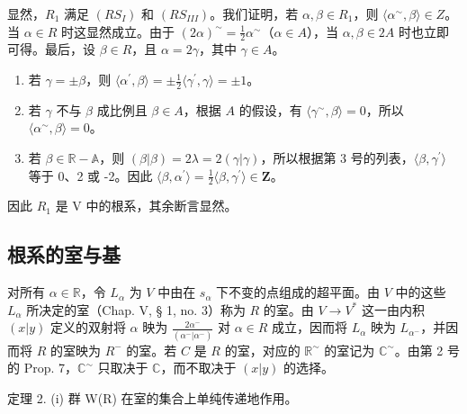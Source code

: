 显然，\(R_{1}\) 满足 \((RS_{I})\) 和 \((RS_{III})\)。我们证明，若 \(\alpha, \beta \in R_{1}\)，则 \(\langle\alpha^{\sim}, \beta\rangle \in Z\)。当 \(\alpha \in R\) 时这显然成立。由于 \((2\alpha)^{\sim} = \frac{1}{2}\alpha^{\sim}\)（\(\alpha \in A\)），当 \(\alpha, \beta \in 2A\) 时也立即可得。最后，设 \(\beta \in R\)，且 \(\alpha = 2\gamma\)，其中 \(\gamma \in A\)。

\begin{enumerate}
\def\labelenumi{\arabic{enumi})}
\item
  若 \(\gamma = \pm \beta\)，则 \(\langle \alpha^{\prime},\beta \rangle = \pm \frac{1}{2}\langle \gamma^{\prime},\gamma \rangle = \pm 1\)。
\item
  若 \(\gamma\) 不与 \(\beta\) 成比例且 \(\beta \in A\)，根据 \(A\) 的假设，有 \(\langle \gamma^{\sim},\beta \rangle = 0\)，所以 \(\langle \alpha^{\sim},\beta \rangle = 0\)。
\item
  若 \(\beta \in \mathbb{R} - \mathbb{A}\)，则 \((\beta |\beta) = 2\lambda = 2(\gamma |\gamma)\)，所以根据第 3 号的列表，\(\langle \beta, \gamma^{\prime} \rangle\) 等于 0、2 或 -2。因此 \(\langle \beta, \alpha^{\prime} \rangle = \frac{1}{2}\langle \beta, \gamma^{\prime} \rangle \in \mathbf{Z}\)。
\end{enumerate}

因此 \(R_{1}\) 是 V 中的根系，其余断言显然。

\subsection{根系的室与基}

对所有 \(\alpha \in \mathbb{R}\)，令 \(L_{\alpha}\) 为 \(V\) 中由在 \(s_{\alpha}\) 下不变的点组成的超平面。由 \(V\) 中的这些 \(L_{\alpha}\) 所决定的室（Chap. V, § 1, no. 3）称为 \(R\) 的室。由 \(V \to V^{*}\) 这一由内积 \((x|y)\) 定义的双射将 \(\alpha\) 映为 \(\frac{2\alpha^{-}}{(\alpha^{-}|\alpha^{-})}\) 对 \(\alpha \in R\) 成立，因而将 \(L_{\alpha}\) 映为 \(L_{\alpha^{-}}\)，并因而将 \(R\) 的室映为 \(R^{-}\) 的室。若 \(C\) 是 \(R\) 的室，对应的 \(\mathbb{R}^{\sim}\) 的室记为 \(\mathbb{C}^{\sim}\)。由第 2 号的 Prop. 7，\(\mathbb{C}^{\sim}\) 只取决于 \(\mathbb{C}\)，而不取决于 \((x|y)\) 的选择。

定理 2. (i) 群 W(R) 在室的集合上单纯传递地作用。

